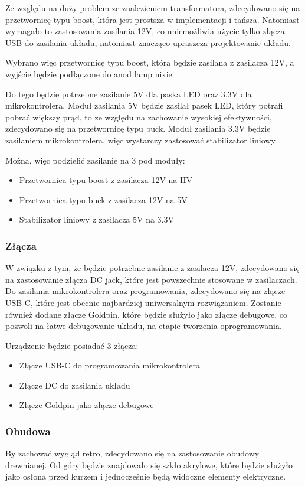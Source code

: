 \documentclass[../main.tex]{subfiles}
\begin{document}
Ze względu na duży problem ze znalezieniem transformatora, zdecydowano się na przetwornicę typu boost, która jest prostsza w implementacji i tańsza. Natomiast wymagało
to zastosowania zasilania 12V, co uniemożliwia użycie tylko złącza USB do zasilania układu, natomiast znacząco upraszcza projektowanie układu.

Wybrano więc przetwornicę typu boost, która będzie zasilana z zasilacza 12V, a wyjście będzie podłączone do anod lamp nixie.

Do tego będzie potrzebne zasilanie 5V dla paska LED oraz 3.3V dla mikrokontrolera. Moduł zasilania 5V będzie zasilał pasek LED, który potrafi pobrać większy prąd,
to ze względu na zachowanie wysokiej efektywności, zdecydowano się na przetwornicę typu buck. Moduł zasilania 3.3V będzie zasilaniem mikrokontrolera, więc wystarczy zastosować
stabilizator liniowy.

Można, więc podzielić zasilanie na 3 pod moduły:
\begin{itemize}
    \item Przetwornica typu boost z zasilacza 12V na HV
    \item Przetwornica typu buck z zasilacza 12V na 5V
    \item Stabilizator liniowy z zasilacza 5V na 3.3V
\end{itemize}

\subsubsection{Złącza}
W związku z tym, że będzie potrzebne zasilanie z zasilacza 12V, zdecydowano się na zastosowanie złącza DC jack, które jest powszechnie stosowane w zasilaczach.
Do zasilania mikrokontrolera oraz programowania, zdecydowano się na złącze USB-C, które jest obecnie najbardziej uniwersalnym rozwiązaniem.
Zostanie również dodane złącze Goldpin, które będzie służyło jako złącze debugowe, co pozwoli na łatwe debugowanie układu, na etapie tworzenia oprogramowania.

Urządzenie będzie posiadać 3 złącza:
\begin{itemize}
    \item Złącze USB-C do programowania mikrokontrolera
    \item Złącze DC do zasilania układu
    \item Złącze Goldpin jako złącze debugowe
\end{itemize}

\subsubsection{Obudowa}
By zachować wygląd retro, zdecydowano się na zastosowanie obudowy drewnianej. Od góry będzie znajdowało się szkło akrylowe, które będzie służyło jako osłona przed kurzem
i jednocześnie będą widoczne elementy elektryczne.
\end{document}
